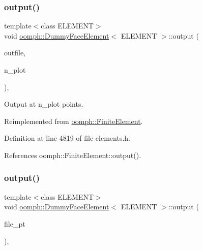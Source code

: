 \subsubsection{\texorpdfstring{output()}{output()}\hspace{0.1cm}{\footnotesize\ttfamily [2/4]}}
{\footnotesize\ttfamily template$<$class E\+L\+E\+M\+E\+NT$>$ \\
void \hyperlink{classoomph_1_1DummyFaceElement}{oomph\+::\+Dummy\+Face\+Element}$<$ E\+L\+E\+M\+E\+NT $>$\+::output (\begin{DoxyParamCaption}\item[{std\+::ostream \&}]{outfile,  }\item[{const unsigned \&}]{n\+\_\+plot }\end{DoxyParamCaption})\hspace{0.3cm}{\ttfamily [inline]}, {\ttfamily [virtual]}}



Output at n\+\_\+plot points. 



Reimplemented from \hyperlink{classoomph_1_1FiniteElement_afa9d9b2670f999b43e6679c9dd28c457}{oomph\+::\+Finite\+Element}.



Definition at line 4819 of file elements.\+h.



References oomph\+::\+Finite\+Element\+::output().

\mbox{\label{classoomph_1_1DummyFaceElement_ae25eed69d7402d8c88b7bf9f264093a7}} 
\subsubsection{\texorpdfstring{output()}{output()}\hspace{0.1cm}{\footnotesize\ttfamily [3/4]}}
{\footnotesize\ttfamily template$<$class E\+L\+E\+M\+E\+NT$>$ \\
void \hyperlink{classoomph_1_1DummyFaceElement}{oomph\+::\+Dummy\+Face\+Element}$<$ E\+L\+E\+M\+E\+NT $>$\+::output (\begin{DoxyParamCaption}\item[{F\+I\+LE $\ast$}]{file\+\_\+pt }\end{DoxyParamCaption})\hspace{0.3cm}{\ttfamily [inline]}, {\ttfamily [virtual]}}



